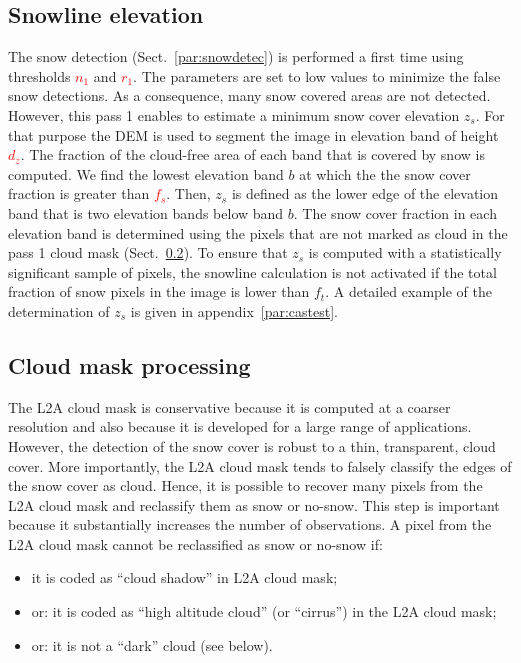 \documentclass[a4paper]{article}
\begin{document}
\subsection{Snowline elevation}

The snow detection (Sect.~\ref{par:snowdetec}) is performed a first time using thresholds \textcolor{red}{$n_1$} and \textcolor{red}{$r_1$}. The parameters are set to low values to minimize the false snow detections. As a consequence, many snow covered areas are not detected. However, this pass 1 enables to estimate a minimum snow cover elevation $z_s$. For that purpose the DEM is used to segment the image in elevation band of height \textcolor{red}{$d_z$}. The fraction of the cloud-free area of each band that is covered by snow is computed. We find the lowest elevation band $b$ at which the the snow cover fraction is greater than \textcolor{red}{$f_s$}. Then, $z_s$ is defined as the lower edge of the elevation band that is two elevation bands below band $b$. The snow cover fraction in each elevation band is determined using the pixels that are not marked as cloud in the pass 1 cloud mask (Sect.~\ref{par:cloud}). To ensure that $z_s$ is computed with a statistically significant sample of pixels, the snowline calculation is not activated if the total fraction of snow pixels in the image is lower than $f_t$. A detailed example of the determination of $z_s$ is given in appendix~\ref{par:castest}.

\subsection{Cloud mask processing}\label{par:cloud}

The L2A cloud mask is conservative because it is computed at a coarser resolution and also because it is developed for a large range of applications. However, the detection of the snow cover is robust to a thin, transparent, cloud cover. More importantly, the L2A cloud mask tends to falsely classify the edges of the snow cover as cloud. Hence, it is possible to recover many pixels from the L2A cloud mask and reclassify them as snow or no-snow. This step is important because it substantially increases the number of observations. A pixel from the L2A cloud mask cannot be reclassified as snow or no-snow if:

\begin{itemize}
 \item it is coded as ``cloud shadow'' in L2A cloud mask;
 \item or: it is coded as ``high altitude cloud'' (or ``cirrus'') in the L2A cloud mask;
 \item or: it is not a ``dark'' cloud (see below).
\end{itemize}
\end{document}
